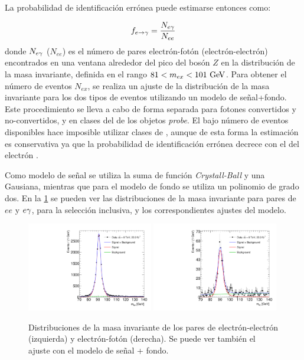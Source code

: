 La probabilidad de identificación errónea {\feg} puede estimarse entonces como:

\begin{equation}\label{eq:efakerate}
  f_{e\rightarrow\gamma} = \frac{N_{e\gamma}}{N_{ee}}
\end{equation}
%
donde $N_{e\gamma}$ ($N_{ee}$) es el número de pares electrón-fotón
(electrón-electrón) encontrados en una ventana alrededor del pico del bosón $Z$ en la distribución de
la masa invariante, definida en el rango $81 < m_{ex} < 101 \gev$. Para obtener
el número de eventos $N_{ex}$, se realiza un ajuste de la distribución de la
masa invariante para los dos tipos de eventos utilizando un modelo de
señal+fondo. Este procedimiento se lleva a cabo de forma separada para fotones
convertidos y no-convertidos, y en clases del {\abseta} de los objetos
\emph{probe}. El bajo número de eventos disponibles hace imposible utilizar
clases de {\pt}, aunque de esta forma la estimación es conservativa ya que la
probabilidad de identificación errónea decrece con el {\pt} del electrón
\cite{Kuhl:1604846}.

Como modelo de señal se utiliza la suma de función \emph{Crystall-Ball} y una
Gausiana, mientras que para el modelo de fondo se utiliza un polinomio de grado
dos. En la \cref{fig:invmass_pairs} se pueden ver las distribuciones de la masa
invariante para pares de $ee$ y $e\gamma$, para la selección inclusiva, y los
correspondientes ajustes del modelo.

\begin{figure}[!htb]
  \centering

  \includegraphics[width=0.49\textwidth]{figures/Fit_mee_efakes_Data_all}
  \includegraphics[width=0.49\textwidth]{figures/Fit_meg_efakes_Data_all}
  \caption{Distribuciones de la masa invariante de los pares de
    electrón-electrón (izquierda) y electrón-fotón (derecha). Se puede ver también el ajuste
    con el modelo de señal + fondo.}
  \label{fig:invmass_pairs}

\end{figure}

